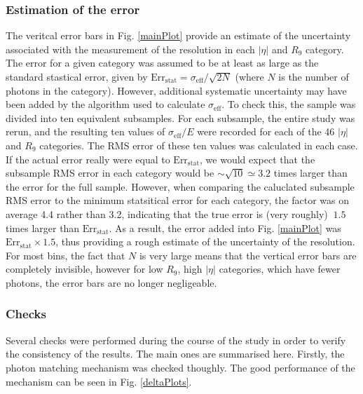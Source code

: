 \documentclass[10pt]{article}
\begin{document}
\subsubsection{Estimation of the error}
The veritcal error bars in Fig. \ref{mainPlot} provide an estimate of the uncertainty associated with the measurement of the resolution in each $|\eta|$ and $R_9$ category. The error for a given category was assumed to be at least as large as the standard stastical error, given by $\text{Err}_{\text{stat}} = \sigma_{\text{eff}}/\sqrt{2N}$ (where $N$ is the number of photons in the category). However, additional systematic uncertainty may have been added by the algorithm used to calculate $\sigma_{\text{eff}}$. To check this, the sample was divided into ten equivalent subsamples. For each subsample, the entire study was rerun, and the resulting ten values of $\sigma_{\text{eff}}/E$ were recorded for each of the 46 $|\eta|$ and $R_9$ categories. The RMS error of these ten values was calculated in each case. If the actual error really were equal to $\text{Err}_{\text{stat}}$, we would expect that the subsample RMS error in each category would be $\sim \sqrt{10} \simeq 3.2$ times larger than the error for the full sample. However, when comparing the caluclated subsample RMS error to the minimum statsitical error for each category, the factor was on average 4.4 rather than 3.2, indicating that the true error is (very roughly) $~1.5$ times larger than $\text{Err}_{\text{stat}} $. As a result, the error added into Fig. \ref{mainPlot} was $\text{Err}_{\text{stat}} \times 1.5$, thus providing a rough estimate of the uncertainty of the resolution. For most bins, the fact that $N$ is very large means that the vertical error bars are completely invisible, however for low $R_9$, high $|\eta|$ categories, which have fewer photons, the error bars are no longer negligeable.

\subsubsection{Checks}

Several checks were performed during the course of the study in order to verify the consistency of the results. The main ones are summarised here. Firstly, the photon matching mechanism was checked thoughly. The good performance of the mechanism can be seen in Fig. \ref{deltaPlots}.
\end{document}
